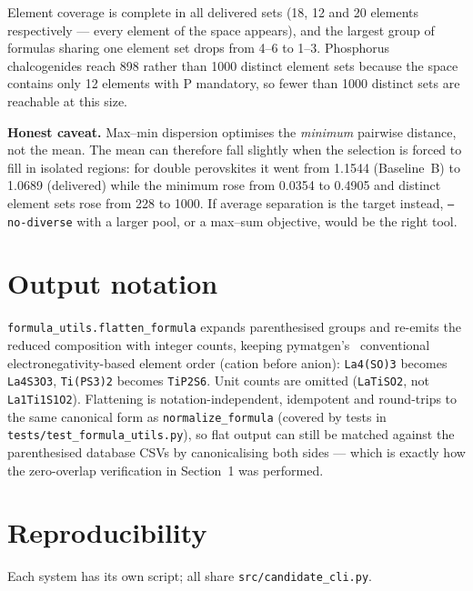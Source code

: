 \documentclass[11pt,a4paper]{article}
\newcommand{\pkg}[1]{\texttt{#1}}
\newcommand{\code}[1]{\texttt{#1}}
\newcommand{\cmd}[1]{\texttt{\small #1}}
\begin{document}
Element coverage is complete in all delivered sets (18, 12 and 20 elements respectively --- every
element of the space appears), and the largest group of formulas sharing one element set drops from
4--6 to 1--3. Phosphorus chalcogenides reach 898 rather than 1000 distinct element sets because the
space contains only 12 elements with P mandatory, so fewer than 1000 distinct sets are reachable at
this size.

\textbf{Honest caveat.} Max--min dispersion optimises the \emph{minimum} pairwise distance, not the
mean. The mean can therefore fall slightly when the selection is forced to fill in isolated
regions: for double perovskites it went from 1.1544 (Baseline~B) to 1.0689 (delivered) while the
minimum rose from 0.0354 to 0.4905 and distinct element sets rose from 228 to 1000. If average
separation is the target instead, \cmd{--no-diverse} with a larger pool, or a max--sum objective,
would be the right tool.

\section{Output notation}

\code{formula\_utils.flatten\_formula} expands parenthesised groups and re-emits the reduced
composition with integer counts, keeping pymatgen's~\cite{pymatgen} conventional
electronegativity-based element order (cation before anion): \code{La4(SO)3} becomes
\code{La4S3O3}, \code{Ti(PS3)2} becomes \code{TiP2S6}. Unit counts are omitted
(\code{LaTiSO2}, not \code{La1Ti1S1O2}). Flattening is notation-independent, idempotent and
round-trips to the same canonical form as \code{normalize\_formula} (covered by tests in
\pkg{tests/test\_formula\_utils.py}), so flat output can still be matched against the parenthesised
database CSVs by canonicalising both sides --- which is exactly how the zero-overlap verification
in Section~1 was performed.

\section{Reproducibility}

Each system has its own script; all share \pkg{src/candidate\_cli.py}.
\end{document}
